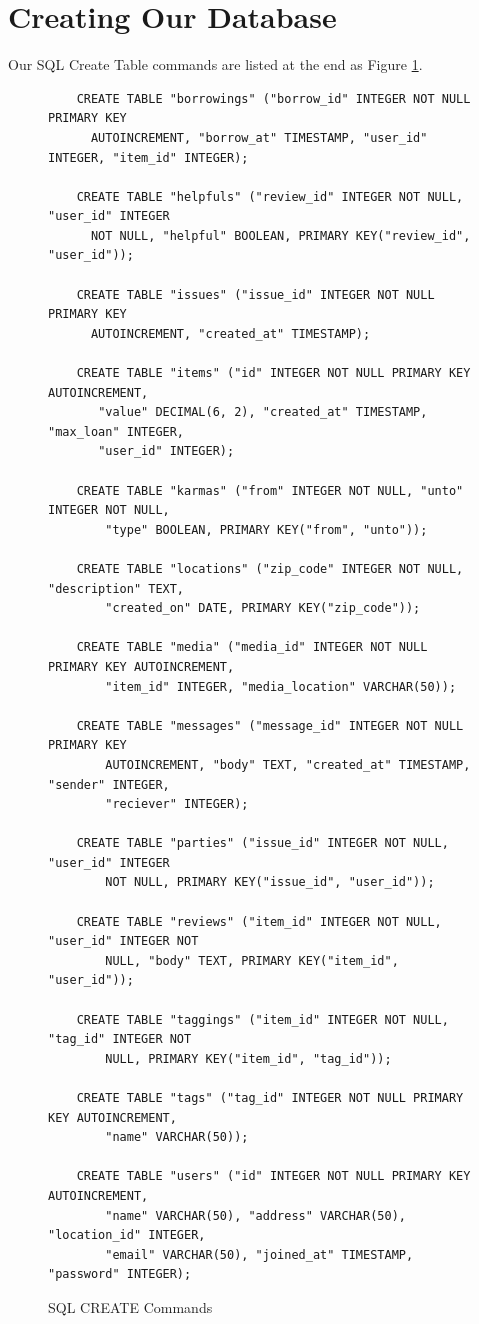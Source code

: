 \documentclass{acm_proc_article-sp}
\begin{document}
\section{Creating Our Database}
Our SQL Create Table commands are listed at the end as Figure \ref{fig:SQLCreateCommands}.
\begin{figure}[p]
    \begin{verbatim}
    CREATE TABLE "borrowings" ("borrow_id" INTEGER NOT NULL PRIMARY KEY 
      AUTOINCREMENT, "borrow_at" TIMESTAMP, "user_id" INTEGER, "item_id" INTEGER);

    CREATE TABLE "helpfuls" ("review_id" INTEGER NOT NULL, "user_id" INTEGER 
      NOT NULL, "helpful" BOOLEAN, PRIMARY KEY("review_id", "user_id"));

    CREATE TABLE "issues" ("issue_id" INTEGER NOT NULL PRIMARY KEY 
      AUTOINCREMENT, "created_at" TIMESTAMP);

    CREATE TABLE "items" ("id" INTEGER NOT NULL PRIMARY KEY AUTOINCREMENT, 
       "value" DECIMAL(6, 2), "created_at" TIMESTAMP, "max_loan" INTEGER, 
       "user_id" INTEGER);

    CREATE TABLE "karmas" ("from" INTEGER NOT NULL, "unto" INTEGER NOT NULL, 
        "type" BOOLEAN, PRIMARY KEY("from", "unto"));

    CREATE TABLE "locations" ("zip_code" INTEGER NOT NULL, "description" TEXT, 
        "created_on" DATE, PRIMARY KEY("zip_code"));

    CREATE TABLE "media" ("media_id" INTEGER NOT NULL PRIMARY KEY AUTOINCREMENT, 
        "item_id" INTEGER, "media_location" VARCHAR(50));

    CREATE TABLE "messages" ("message_id" INTEGER NOT NULL PRIMARY KEY 
        AUTOINCREMENT, "body" TEXT, "created_at" TIMESTAMP, "sender" INTEGER, 
        "reciever" INTEGER);

    CREATE TABLE "parties" ("issue_id" INTEGER NOT NULL, "user_id" INTEGER 
        NOT NULL, PRIMARY KEY("issue_id", "user_id"));

    CREATE TABLE "reviews" ("item_id" INTEGER NOT NULL, "user_id" INTEGER NOT 
        NULL, "body" TEXT, PRIMARY KEY("item_id", "user_id"));

    CREATE TABLE "taggings" ("item_id" INTEGER NOT NULL, "tag_id" INTEGER NOT 
        NULL, PRIMARY KEY("item_id", "tag_id"));

    CREATE TABLE "tags" ("tag_id" INTEGER NOT NULL PRIMARY KEY AUTOINCREMENT, 
        "name" VARCHAR(50));

    CREATE TABLE "users" ("id" INTEGER NOT NULL PRIMARY KEY AUTOINCREMENT, 
        "name" VARCHAR(50), "address" VARCHAR(50), "location_id" INTEGER, 
        "email" VARCHAR(50), "joined_at" TIMESTAMP, "password" INTEGER);
    \end{verbatim}
    \caption{SQL CREATE Commands}
    \label{fig:SQLCreateCommands}
\end{figure}
\end{document}
